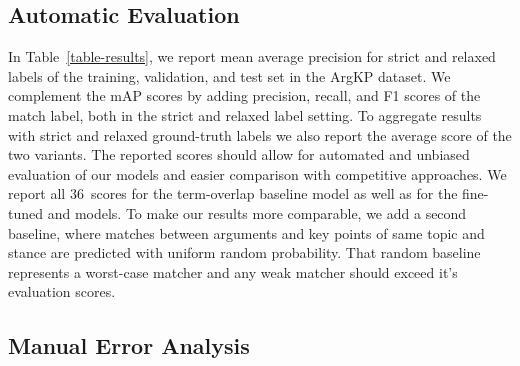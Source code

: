 \subsection{Automatic Evaluation}

In Table~\ref{table-results}, we report mean average precision for strict and relaxed labels of the training, validation, and test set in the ArgKP dataset.
We complement the mAP scores by adding precision, recall, and F1 scores of the match label, both in the strict and relaxed label setting.
To aggregate results with strict and relaxed ground-truth labels we also report the average score of the two variants.
The reported scores should allow for automated and unbiased evaluation of our models and easier comparison with competitive approaches.
We report all 36~scores for the term-overlap baseline model as well as for the fine-tuned \BertBase and \RobertaBase models.
To make our results more comparable, we add a second baseline, where matches between arguments and key points of same topic and stance are predicted with uniform random probability.
That random baseline represents a worst-case matcher and any weak matcher should exceed it's evaluation scores.


\subsection{Manual Error Analysis}

